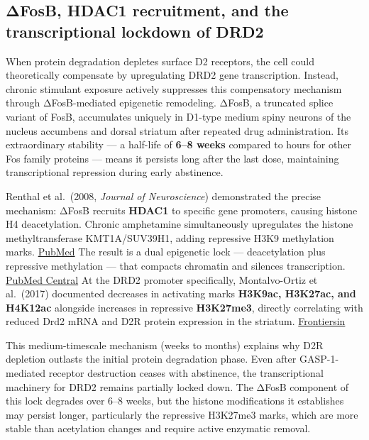 \subsection{ΔFosB, HDAC1 recruitment, and the transcriptional lockdown of DRD2}\label{15_d2_downregulation-ux3b4fosb-hdac1-recruitment-and-the-transcriptional-lockdown-of-drd2}

When protein degradation depletes surface D2 receptors, the cell could theoretically compensate by upregulating DRD2 gene transcription. Instead, chronic stimulant exposure actively suppresses this compensatory mechanism through ΔFosB-mediated epigenetic remodeling. ΔFosB, a truncated splice variant of FosB, accumulates uniquely in D1-type medium spiny neurons of the nucleus accumbens and dorsal striatum after repeated drug administration. Its extraordinary stability --- a half-life of \textbf{6--8 weeks} compared to hours for other Fos family proteins --- means it persists long after the last dose, maintaining transcriptional repression during early abstinence.

Renthal et al.~(2008, \emph{Journal of Neuroscience}) demonstrated the precise mechanism: ΔFosB recruits \textbf{HDAC1} to specific gene promoters, causing histone H4 deacetylation. Chronic amphetamine simultaneously upregulates the histone methyltransferase KMT1A/SUV39H1, adding repressive H3K9 methylation marks. \href{https://pubmed.ncbi.nlm.nih.gov/18632938/}{PubMed} The result is a dual epigenetic lock --- deacetylation plus repressive methylation --- that compacts chromatin and silences transcription. \href{https://pmc.ncbi.nlm.nih.gov/articles/PMC4622560/}{PubMed Central} At the DRD2 promoter specifically, Montalvo-Ortiz et al.~(2017) documented decreases in activating marks \textbf{H3K9ac, H3K27ac, and H4K12ac} alongside increases in repressive \textbf{H3K27me3}, directly correlating with reduced Drd2 mRNA and D2R protein expression in the striatum. \href{https://public-pages-files-2025.frontiersin.org/journals/neuroscience/articles/10.3389/fnins.2021.674745/xml/nlm}{Frontiersin}

This medium-timescale mechanism (weeks to months) explains why D2R depletion outlasts the initial protein degradation phase. Even after GASP-1-mediated receptor destruction ceases with abstinence, the transcriptional machinery for DRD2 remains partially locked down. The ΔFosB component of this lock degrades over 6--8 weeks, but the histone modifications it establishes may persist longer, particularly the repressive H3K27me3 marks, which are more stable than acetylation changes and require active enzymatic removal.

